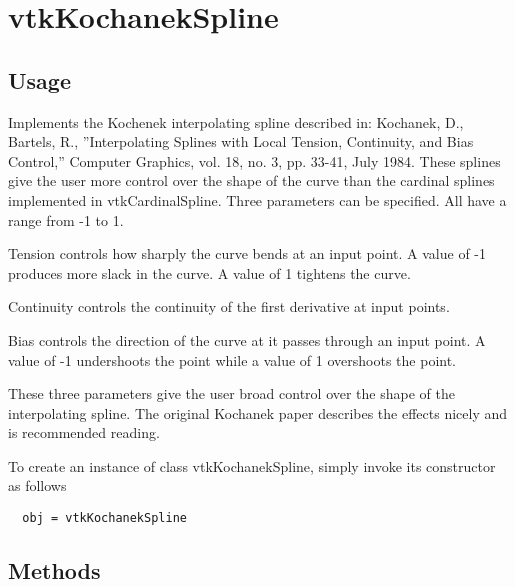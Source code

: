\section{vtkKochanekSpline}

\subsection{Usage}

 Implements the Kochenek interpolating spline described in: Kochanek, D.,
 Bartels, R., ''Interpolating Splines with Local Tension, Continuity, and
 Bias Control,'' Computer Graphics, vol. 18, no. 3, pp. 33-41, July 1984.
 These splines give the user more control over the shape of the curve than
 the cardinal splines implemented in vtkCardinalSpline. Three parameters
 can be specified. All have a range from -1 to 1.
 
 Tension controls how sharply the curve bends at an input point. A
 value of -1 produces more slack in the curve. A value of 1 tightens
 the curve.
 
 Continuity controls the continuity of the first derivative at input
 points. 
 
 Bias controls the direction of the curve at it passes through an input
 point. A value of -1 undershoots the point while a value of 1
 overshoots the point.
 
 These three parameters give the user broad control over the shape of
 the interpolating spline. The original Kochanek paper describes the
 effects nicely and is recommended reading.

To create an instance of class vtkKochanekSpline, simply
invoke its constructor as follows
\begin{verbatim}
  obj = vtkKochanekSpline
\end{verbatim}
\subsection{Methods}

